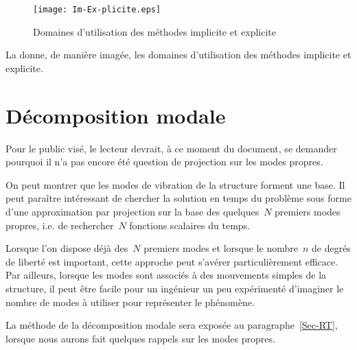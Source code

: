 \medskip
\begin{figure}[ht]
\centering\texttt{[image: Im-Ex-plicite.eps]}
\caption{Domaines d'utilisation des méthodes implicite et explicite}\label{Fig-Im-Ex-plicite}
\end{figure}
La  donne, de manière imagée, les domaines d'utilisation des méthodes implicite et explicite.




\bigskip
\section{Décomposition modale}

Pour le public visé, le lecteur devrait, à ce moment du document, se demander pourquoi il n'a pas encore été question de projection sur les modes propres.

\medskip
On peut montrer que les modes de vibration de la structure forment une base. Il peut paraître intéressant de chercher la solution en temps du problème sous forme d'une approximation par projection sur la base des quelques~$N$ premiers modes propres, i.e. de rechercher~$N$ fonctions scalaires du temps.

Lorsque l'on dispose déjà des~$N$ premiers modes et lorsque le nombre~$n$ de degrés de liberté est important, cette approche peut s'avérer particulièrement efficace. Par ailleurs, lorsque les modes sont associés à des mouvements simples de la structure, il peut être facile pour un ingénieur un peu expérimenté d'imaginer le nombre de modes à utiliser pour représenter le phénomène.

\medskip
La méthode de la décomposition modale sera exposée au paragraphe~\ref{Sec-RT}, lorsque nous aurons fait quelques rappels sur les modes propres.





